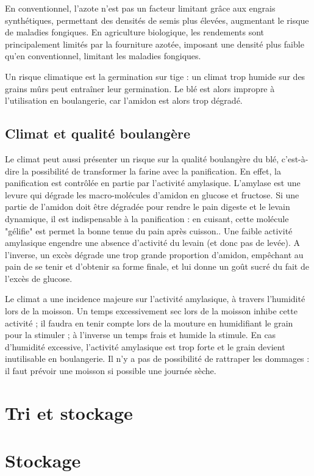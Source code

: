 \documentclass{article}
\begin{document}
En conventionnel, l'azote n'est pas un facteur limitant grâce aux engrais synthétiques, permettant des densités de semis plus élevées, augmentant le risque de maladies fongiques. En agriculture biologique, les rendements sont principalement limités par la fourniture azotée, imposant une densité plus faible qu'en conventionnel, limitant les maladies fongiques. 

Un risque climatique est la germination sur tige : un climat trop humide sur des grains mûrs peut entraîner leur germination. Le blé est alors impropre à l'utilisation en boulangerie, car l'amidon est alors trop dégradé.

\subsection{Climat et qualité boulangère}

Le climat peut aussi présenter un risque sur la qualité boulangère du blé, c'est-à-dire la possibilité de transformer la farine avec la panification. En effet, la panification est contrôlée en partie par l'activité amylasique. L'amylase est une levure qui dégrade les macro-molécules d'amidon en glucose et fructose. Si une partie de l'amidon doit être dégradée pour rendre le pain digeste et le levain dynamique, il est indispensable à la panification : en cuisant, cette molécule "gélifie" est permet la bonne tenue du pain après cuisson.. Une faible activité amylasique engendre une absence d'activité du levain (et donc pas de levée). A l'inverse, un excès dégrade une trop grande proportion d'amidon, empêchant au pain de se tenir et d'obtenir sa forme finale, et lui donne un goût sucré du fait de l'excès de glucose.

Le climat a une incidence majeure sur l'activité amylasique, à travers l'humidité lors de la moisson. Un temps excessivement sec lors de la moisson inhibe cette activité ; il faudra en tenir compte lors de la mouture en humidifiant le grain pour la stimuler ; à l'inverse un temps frais et humide la stimule. En cas d'humidité excessive, l'activité amylasique est trop forte et le grain devient inutilisable en boulangerie. Il n'y a pas de possibilité de rattraper les dommages : il faut prévoir une moisson si possible une journée sèche. 

\section{Tri et stockage}

\section{Stockage}
\end{document}
